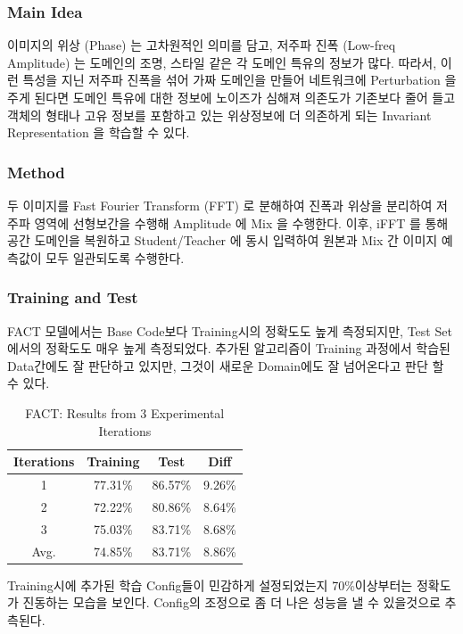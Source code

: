 \subsubsection{Main Idea}
이미지의 위상 (Phase) 는 고차원적인 의미를 담고, 저주파 진폭 (Low-freq Amplitude) 는 
도메인의 조명, 스타일 같은 각 도메인 특유의 정보가 많다. 따라서, 이런 특성을 지닌 저주파 진폭을 
섞어 가짜 도메인을 만들어 네트워크에 Perturbation 을 주게 된다면 도메인 특유에 대한 정보에 노이즈가 
심해져 의존도가 기존보다 줄어 들고 객체의 형태나 고유 정보를 포함하고 있는 위상정보에 더 의존하게 
되는 Invariant Representation 을 학습할 수 있다.

\subsubsection{Method}
두 이미지를 Fast Fourier Transform (FFT) 로 분해하여 진폭과 위상을 분리하여 저주파 영역에 
선형보간을 수행해 Amplitude 에 Mix 을 수행한다. 이후, iFFT 를 통해 공간 도메인을 복원하고 
Student/Teacher 에 동시 입력하여 원본과 Mix 간 이미지 예측값이 모두 일관되도록 수행한다.

\subsubsection{Training and Test}
FACT 모델에서는 Base Code보다 Training시의 정확도도 높게 측정되지만, Test Set에서의 정확도도 매우 
높게 측정되었다. 추가된 알고리즘이 Training 과정에서 학습된 Data간에도 잘 판단하고 있지만,
그것이 새로운 Domain에도 잘 넘어온다고 판단 할 수 있다.

\begin{table}[h]
  \centering
  \begin{tabular}{cccc}
  \toprule
  Iterations & Training & Test & Diff \\
  \midrule
  1 & 77.31\% & 86.57\% & 9.26\% \\
  2 & 72.22\% & 80.86\% & 8.64\% \\
  3 & 75.03\% & 83.71\% & 8.68\% \\
  Avg. & 74.85\% & 83.71\% & 8.86\% \\
  \bottomrule
  \end{tabular}
  \caption{FACT: Results from 3 Experimental Iterations}
  \label{tab:FACTResults}
\end{table}

Training시에 추가된 학습 Config들이 민감하게 설정되었는지 70\%이상부터는 정확도가 진동하는 모습을 보인다. 
Config의 조정으로 좀 더 나은 성능을 낼 수 있을것으로 추측된다.

